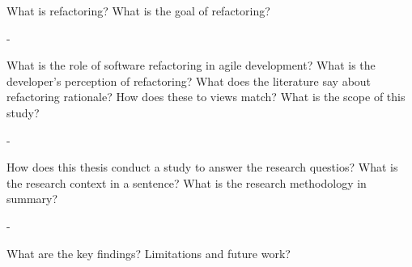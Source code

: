 \documentclass[english,12pt,a4paper,pdftex,sci,utf8]{aaltothesis}
\begin{document}


\makecoverpage



\begin{abstractpage}[english]
What is refactoring? What is the goal of refactoring?

-

What is the role of software refactoring in agile development? What is the developer's perception of refactoring? What does the literature say about refactoring rationale? How does these to views match? What is the scope of this study?

-

How does this thesis conduct a study to answer the research questios? What is the research context in a sentence? What is the research methodology in summary?

-

What are the key findings? Limitations and future work?
\end{abstractpage}


\end{document}
